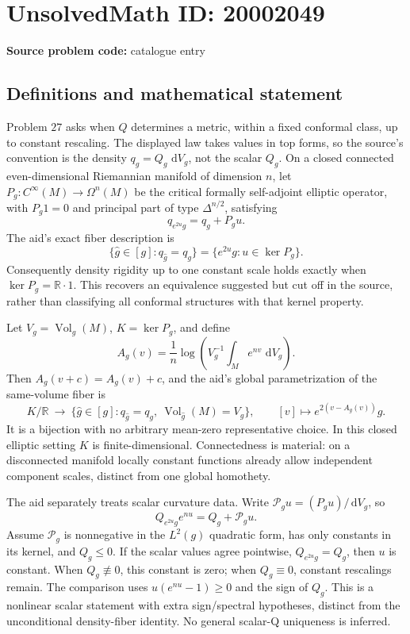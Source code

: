 \documentclass[11pt]{article}
\newcommand{\R}{\mathbb{R}}
\newcommand{\dd}{\,\mathrm{d}}
\begin{document}
\section*{UnsolvedMath ID: 20002049}
\textbf{Source problem code:} catalogue entry
\subsection{Definitions and mathematical statement}
Problem \(27\) asks when \(Q\) determines a metric, within a fixed conformal class, up to constant rescaling. The displayed law takes values in top forms, so the source's convention is the density \(q_g=Q_g\,\dd V_g\), not the scalar \(Q_g\). On a closed connected even-dimensional Riemannian manifold of dimension \(n\), let \(P_g:C^\infty(M)\to\Omega^n(M)\) be the critical formally self-adjoint elliptic operator, with \(P_g1=0\) and principal part of type \(\Delta^{n/2}\), satisfying
\[
 q_{e^{2u}g}=q_g+P_gu.
\]
The aid's exact fiber description is
\[
 \{\widehat g\in[g]:q_{\widehat g}=q_g\}
       =\{e^{2u}g:u\in\ker P_g\}.
\]
Consequently density rigidity up to one constant scale holds exactly when \(\ker P_g=\R\cdot1\). This recovers an equivalence suggested but cut off in the source, rather than classifying all conformal structures with that kernel property.

Let \(V_g=\operatorname{Vol}_g(M)\), \(K=\ker P_g\), and define
\[
 A_g(v)=\frac1n\log\left(V_g^{-1}\int_Me^{nv}\,\dd V_g\right).
\]
Then \(A_g(v+c)=A_g(v)+c\), and the aid's global parametrization of the same-volume fiber is
\[
 K/\R\ \longrightarrow\
 \{\widehat g\in[g]:q_{\widehat g}=q_g,\ \operatorname{Vol}_{\widehat g}(M)=V_g\},
 \qquad[v]\longmapsto e^{2(v-A_g(v))}g.
\]
It is a bijection with no arbitrary mean-zero representative choice. In this closed elliptic setting \(K\) is finite-dimensional. Connectedness is material: on a disconnected manifold locally constant functions already allow independent component scales, distinct from one global homothety.

The aid separately treats scalar curvature data. Write \(\mathscr P_g u=(P_gu)/\dd V_g\), so
\[
 Q_{e^{2u}g}e^{nu}=Q_g+\mathscr P_gu.
\]
Assume \(\mathscr P_g\) is nonnegative in the \(L^2(g)\) quadratic form, has only constants in its kernel, and \(Q_g\leq0\). If the scalar values agree pointwise, \(Q_{e^{2u}g}=Q_g\), then \(u\) is constant. When \(Q_g\not\equiv0\), this constant is zero; when \(Q_g\equiv0\), constant rescalings remain. The comparison uses \(u(e^{nu}-1)\geq0\) and the sign of \(Q_g\). This is a nonlinear scalar statement with extra sign/spectral hypotheses, distinct from the unconditional density-fiber identity. No general scalar-Q uniqueness is inferred.
\end{document}
